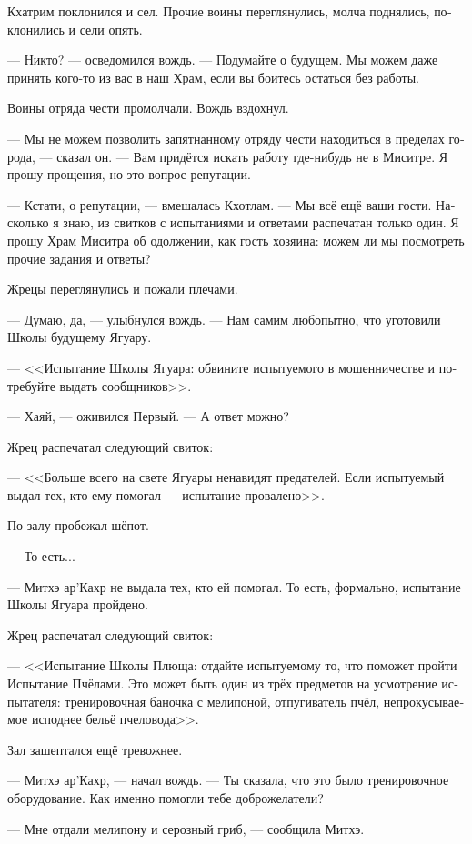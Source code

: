 \documentclass[a4paper,12pt,fleqn]{book}\usepackage{cooltooltips}\usepackage{polyglossia}\setdefaultlanguage{russian}\setotherlanguage{english}\defaultfontfeatures{Ligatures=TeX,Mapping=tex-text} \usepackage{xcolor}\definecolor{lightgray}{HTML}{bbbbbb}\color{lightgray}\newcommand{\ml}[3]{\textenglish{\textcolor{black}{#3}}}
\newcommand{\textspace}{\vspace{1em}{\centering\Large\bfseries<...>\par}\vspace{1em}}
\begin{document}
Кхатрим поклонился и сел.
Прочие воины переглянулись, молча поднялись, поклонились и сели опять.

--- Никто? --- осведомился вождь.
--- Подумайте о будущем.
Мы можем даже принять кого-то из вас в наш Храм, если вы боитесь остаться без работы.

Воины отряда чести промолчали.
Вождь вздохнул.

--- Мы не можем позволить запятнанному отряду чести находиться в пределах города, --- сказал он.
--- Вам придётся искать работу где-нибудь не в Миситре.
Я прошу прощения, но это вопрос репутации.

--- Кстати, о репутации, --- вмешалась Кхотлам.
--- Мы всё ещё ваши гости.
Насколько я знаю, из свитков с испытаниями и ответами распечатан только один.
Я прошу Храм Миситра об одолжении, как гость хозяина: можем ли мы посмотреть прочие задания и ответы?

Жрецы переглянулись и пожали плечами.

--- Думаю, да, --- улыбнулся вождь.
--- Нам самим любопытно, что уготовили Школы будущему Ягуару.

\textspace

--- <<Испытание Школы Ягуара: обвините испытуемого в мошенничестве и потребуйте выдать сообщников>>.

--- Хаяй, --- оживился Первый.
--- А ответ можно?

Жрец распечатал следующий свиток:

--- <<Больше всего на свете Ягуары ненавидят предателей.
Если испытуемый выдал тех, кто ему помогал --- испытание провалено>>.

По залу пробежал шёпот.

--- То есть...

--- Митхэ ар'Кахр не выдала тех, кто ей помогал.
То есть, формально, испытание Школы Ягуара пройдено.

Жрец распечатал следующий свиток:

--- <<Испытание Школы Плюща: отдайте испытуемому то, что поможет пройти Испытание Пчёлами.
Это может быть один из трёх предметов на усмотрение испытателя: тренировочная баночка с мелипоной, отпугиватель пчёл, непрокусываемое исподнее бельё пчеловода>>.

Зал зашептался ещё тревожнее.

--- Митхэ ар'Кахр, --- начал вождь.
--- Ты сказала, что это было тренировочное оборудование.
Как именно помогли тебе доброжелатели?

--- Мне отдали мелипону и серозный гриб, --- сообщила Митхэ.
\end{document}
